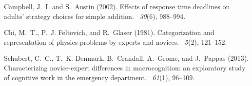 \documentclass[12pt]{article}
\begin{document}
%

%

\begin{thebibliography}{}

Campbell, J.~I. and S.~Austin (2002).
\newblock Effects of response time deadlines on adults' strategy choices for
  simple addition.
~{\em 30\/}(6), 988--994.

Chi, M.~T., P.~J. Feltovich, and R.~Glaser (1981).
\newblock Categorization and representation of physics problems by experts and
  novices.
~{\em 5\/}(2), 121--152.

Schubert, C.~C., T.~K. Denmark, B.~Crandall, A.~Grome, and J.~Pappas (2013).
\newblock Characterizing novice-expert differences in macrocognition: an
  exploratory study of cognitive work in the emergency department.
~{\em 61\/}(1), 96--109.

\end{thebibliography}
\end{document}
